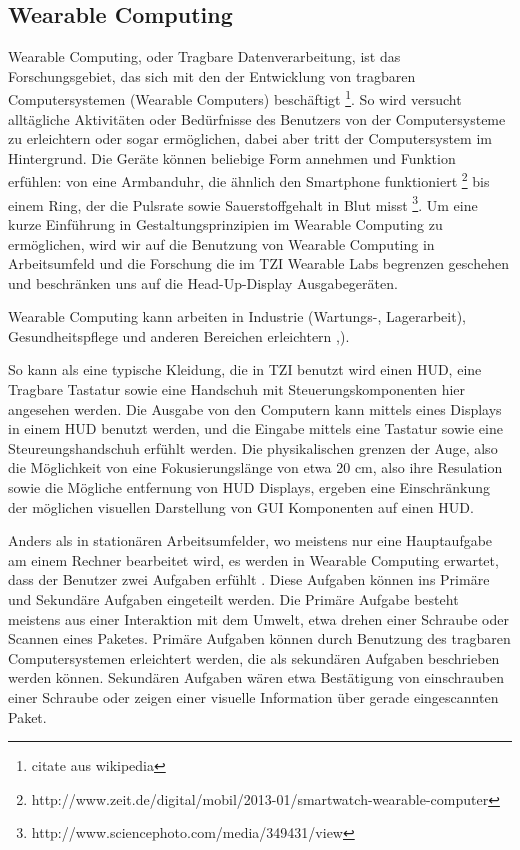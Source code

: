


\subsection{Wearable Computing} 
\label{sub:wearable_computers}

Wearable Computing, oder Tragbare Datenverarbeitung, ist das Forschungsgebiet, das sich mit den der Entwicklung von tragbaren Computersystemen (Wearable Computers) beschäftigt \footnote{citate aus wikipedia }. So wird versucht alltägliche Aktivitäten oder Bedürfnisse des Benutzers  von der Computersysteme zu erleichtern oder sogar ermöglichen, dabei aber tritt der Computersystem im Hintergrund. Die Geräte können beliebige Form annehmen und Funktion erfühlen: von eine Armbanduhr, die ähnlich den Smartphone funktioniert \footnote{http://www.zeit.de/digital/mobil/2013-01/smartwatch-wearable-computer} bis einem  Ring, der die Pulsrate sowie Sauerstoffgehalt in Blut misst \footnote{http://www.sciencephoto.com/media/349431/view}.  Um eine kurze Einführung in Gestaltungsprinzipien im Wearable Computing zu ermöglichen, wird wir auf die Benutzung von Wearable Computing in Arbeitsumfeld und die Forschung die im TZI Wearable Labs begrenzen geschehen und beschränken uns auf die Head-Up-Display Ausgabegeräten.

Wearable Computing kann arbeiten in Industrie (Wartungs-, Lagerarbeit), Gesundheitspflege und anderen Bereichen erleichtern \cite{Witt:2006hi},\cite{Lawo:2008gg}). 



So kann als eine typische Kleidung, die in TZI benutzt wird einen HUD, eine Tragbare Tastatur sowie eine Handschuh mit Steuerungskomponenten hier angesehen werden. Die Ausgabe von den Computern kann mittels eines Displays in einem HUD benutzt werden, und die Eingabe mittels eine Tastatur sowie eine Steureungshandschuh erfühlt werden. Die physikalischen grenzen der Auge, also die Möglichkeit von eine Fokusierungslänge von etwa 20 cm, also ihre Resulation sowie die Mögliche entfernung von HUD Displays, ergeben eine Einschränkung der möglichen visuellen Darstellung von GUI Komponenten auf einen HUD. 

Anders als in stationären Arbeitsumfelder, wo meistens nur eine Hauptaufgabe am einem Rechner bearbeitet wird, es werden in Wearable Computing erwartet, dass der Benutzer zwei Aufgaben erfühlt \cite{Witt:2006hi}. Diese Aufgaben können ins Primäre und Sekundäre Aufgaben eingeteilt werden. Die Primäre Aufgabe besteht meistens aus einer Interaktion mit dem Umwelt, etwa drehen einer Schraube oder Scannen eines Paketes. Primäre Aufgaben können durch Benutzung des tragbaren Computersystemen erleichtert werden, die als sekundären Aufgaben beschrieben werden können. Sekundären Aufgaben wären etwa Bestätigung von einschrauben einer Schraube oder zeigen einer visuelle Information über gerade eingescannten Paket. 

